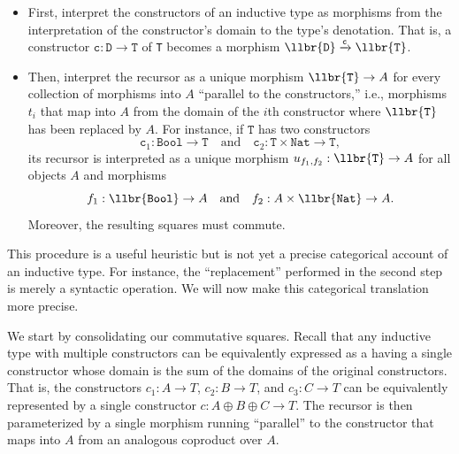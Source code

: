 \begin{itemize}
  \item First, interpret the constructors of an inductive type as morphisms from the interpretation
  of the constructor's domain to the type's denotation. That is, a constructor $\texttt{c} :
  \texttt{D} \to \texttt{T}$ of \texttt{T} becomes a morphism $\llbr{\texttt{D}}
  \xrightarrow{\texttt{c}} \llbr{\texttt{T}}$.
  \item Then, interpret the recursor as a unique morphism $\llbr{\texttt{T}} \to A$ for every
  collection of morphisms into $A$ ``parallel to the constructors,'' i.e., morphisms $t_i$ that map
  into $A$ from the domain of the $i$th constructor where $\llbr{\texttt{T}}$ has been replaced by
  $A$. For instance, if $\texttt{T}$ has two constructors
  \[ \texttt{c}_1 : \texttt{Bool} \to \texttt{T} \quad\text{and}\quad
     \texttt{c}_2 : \texttt{T} \times \texttt{Nat} \to \texttt{T}, \]
  its recursor is interpreted as a unique morphism $u_{f_1, f_2} : \llbr{\texttt{T}} \to A$ for
  all objects $A$ and morphisms
  \[ f_1 : \llbr{\texttt{Bool}} \to A \quad\text{and}\quad
     f_2 : A \times \llbr{\texttt{Nat}} \to A. \]
  Moreover, the resulting squares must commute.
\end{itemize}

This procedure is a useful heuristic but is not yet a precise categorical account of an inductive
type. For instance, the ``replacement'' performed in the second step is merely a syntactic
operation. We will now make this categorical translation more precise.

We start by consolidating our commutative squares. Recall that any inductive type with multiple
constructors can be equivalently expressed as a having a single constructor whose domain is the sum
of the domains of the original constructors. That is, the constructors $c_1 : A \to T$, $c_2 : B \to
T$, and $c_3 : C \to T$ can be equivalently represented by a single constructor $c : A \oplus B
\oplus C \to T$. The recursor is then parameterized by a single morphism running  ``parallel'' to
the constructor that maps into $A$ from an analogous coproduct over $A$.

